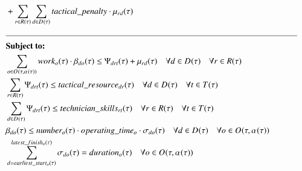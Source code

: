 {\begin{alignat}{2}
		& + \sum_{r \in \SetResource} \sum_{\ElementDays \in \SetDays{}} \ParTacticalPenalty \cdot \VarTacticalExcess                                                                                                                                                                                \\  
		& \text{\rule{\linewidth}{0.4pt}} \notag\\
		& \textbf{Subject to:}                                                                                                                                                                                                                                                                 \notag\\
		& \sum_{\ElementOperation \in \SetOperation{}{\VarStrategicWorkOrderAssignment{}{}}} \ParOperationWork{\ElementOperation} \cdot \VarTacticalWork{\ElementDays}{\ElementOperation} \leq \VarTacticalResource + \VarTacticalExcess \quad \forall \ElementDays \in \SetDays{} \quad \forall r \in \SetResource                                                                                                                                                                                                                 \\ 
		& \sum_{\ElementResource \in \SetResource} \VarTacticalResource \leq \ParTacticalResource \quad \forall \ElementDays \in \SetDays{} \quad \forall \ElementTechnician \in \SetTechnician \\
		& \sum_{\ElementDays \in \SetDays{}} \VarTacticalResource \leq \ParTechnicianSkill \quad \forall \ElementResource \in \SetResource \quad \forall \ElementTechnician \in \SetTechnician \\
		& \VarTacticalWork{\ElementDays}{\ElementOperation} \leq \ParNumberOfPeople \cdot \ParOperatingTime \cdot \VarTacticalWorkBinary{\ElementDays}{\ElementOperation}                                                                                                                                                                   \quad \forall \ElementDays \in \SetDays{} \quad \forall \ElementOperation \in \SetOperation{}{\VarStrategicWorkOrderAssignment{}{}}                                                                                                                                                        \\
		& \sum_{\ElementDays = \ParEarliestStart}^{\ParLatestFinish} \VarTacticalWorkBinary{\ElementDays}{\ElementOperation} = \ParDuration                                                                                                                                 \quad \forall \ElementOperation \in \SetOperation{}{\VarStrategicWorkOrderAssignment{}{}}                                                                                                                                                                                                  \\

\end{alignat}}
